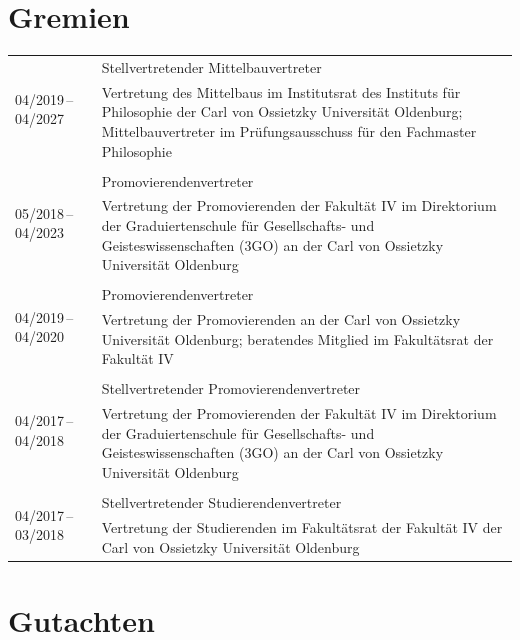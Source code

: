 \documentclass[a4paper,10pt]{article}
\begin{document}
\clearpage
\section{Gremien}
\begin{longtable}{p{2.5cm}p{11cm}}
\multirow{2}{2.5cm}{\footnotesize{04/2019\,--\,04/2027}} & Stellvertretender Mittelbauvertreter\\
& \footnotesize{Vertretung des Mittelbaus im Institutsrat des Instituts für Philosophie der Carl von Ossietzky Universität Oldenburg; Mittelbauvertreter im Prüfungsausschuss für den Fachmaster Philosophie}\\
\\
\multirow{2}{2.5cm}{\footnotesize{05/2018\,--\,04/2023}} & Promovierendenvertreter\\
& \footnotesize{Vertretung der Promovierenden der Fakultät IV im Direktorium der Graduiertenschule für Gesellschafts- und Geisteswissenschaften (3GO) an der Carl von Ossietzky Universität Oldenburg}\\
\\
\multirow{2}{2.5cm}{\footnotesize{04/2019\,--\,04/2020}} & Promovierendenvertreter\\
& \footnotesize{Vertretung der Promovierenden an der Carl von Ossietzky Universität Oldenburg; beratendes Mitglied im Fakultätsrat der Fakultät IV}\\
\\
\multirow{2}{2.5cm}{\footnotesize{04/2017\,--\,04/2018}} & Stellvertretender Promovierendenvertreter\\
& \footnotesize{Vertretung der Promovierenden der Fakultät IV im Direktorium der Graduiertenschule für Gesellschafts- und Geisteswissenschaften (3GO) an der Carl von Ossietzky Universität Oldenburg}\\
\\
\multirow{2}{2.5cm}{\footnotesize{04/2017\,--\,03/2018}} & Stellvertretender Studierendenvertreter\\
& \footnotesize{Vertretung der Studierenden im Fakultätsrat der Fakultät IV der Carl von Ossietzky Universität Oldenburg}\\
\end{longtable}


\clearpage
\section{Gutachten}
\end{document}
